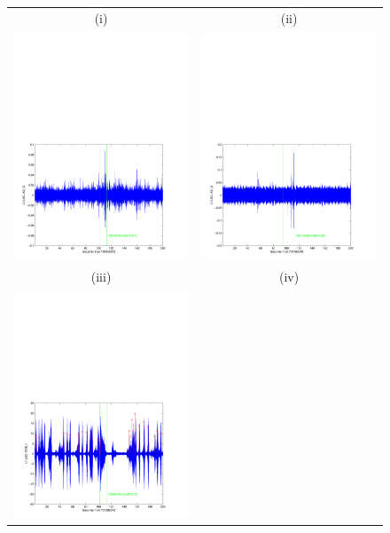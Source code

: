 \begin{figure}[p]
\label{f:vetoes}
\vspace{5pt}
\begin{center}
\begin{tabular}{cc}
(i) & (ii) \\
\includegraphics[width=0.475\linewidth]{figures/pipeline/trigger_730592784_as_q} &
\includegraphics[width=0.475\linewidth]{figures/pipeline/trigger_734153360_as_q}\\
(iii) & (iv) \\
\includegraphics[width=0.475\linewidth]{figures/pipeline/trigger_730592784_pob_i} &

\end{tabular}
\end{center}
\end{figure}
